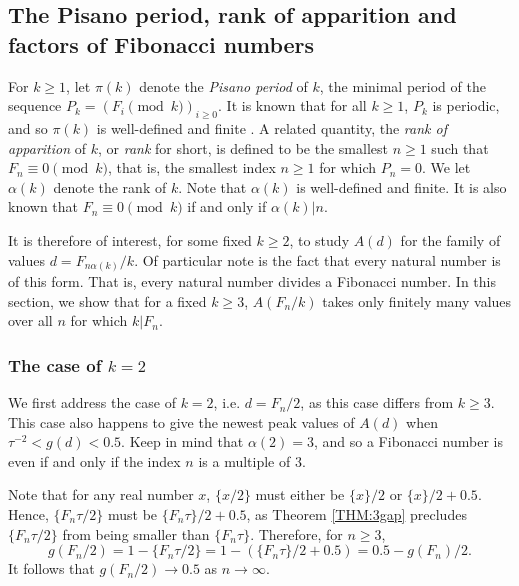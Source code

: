 \documentclass[10pt,a4paper,reqno]{amsart}
\begin{document}
\subsection{The {P}isano period, rank of apparition and factors of {F}ibonacci numbers}
For $k\geq 1$, let $\pi(k)$ denote the \emph{Pisano period} of $k$, the minimal period of the sequence $P_k = (F_i \pmod k)_{i \geq 0}$. It is known that for all $k \geq 1$, $P_k$ is periodic, and so $\pi(k)$ is well-defined and finite \cite{vajda1989}. A related quantity, the \emph{rank of apparition} of $k$, or \emph{rank} for short, is defined to be the smallest $n \geq 1$ such that $F_n\equiv 0 \pmod{k}$, that is, the smallest index $n\geq 1$ for which $P_n=0$. We let $\alpha(k)$ denote the rank of $k$. Note that $\alpha(k)$ is well-defined and finite. It is also known that $F_n \equiv 0 \pmod{k}$ if and only if $\alpha(k)|n$.

It is therefore of interest, for some fixed $k\geq 2$, to study $A(d)$ for the family of values $d=F_{n\alpha(k)}/k$. Of particular note is the fact that every natural number is of this form. That is, every natural number divides a Fibonacci number. In this section, we show that for a fixed $k\geq 3$, $A(F_n/k)$ takes only finitely many values over all $n$ for which $k|F_n$.

\subsubsection{The case of $k = 2$}
We first address the case of $k=2$, i.e. $d=F_n/2$, as this case differs from $k \geq 3$. This case also happens to give the newest peak values of $A(d)$ when $\tau^{-2}<g(d)<0.5$. Keep in mind that $\alpha(2)=3$, and so a Fibonacci number is even if and only if the index $n$ is a multiple of $3$.

Note that for any real number $x$, $\{x/2\}$ must either be $\{x\}/2$ or $\{x\}/2+0.5$. Hence, $\{F_n\tau/2\}$ must be $\{F_n \tau\}/2+0.5$, as Theorem \ref{THM:3gap} precludes $\{F_n\tau/2\}$ from being smaller than $\{F_n\tau\}$. Therefore, for $n \geq 3$,
\[
g(F_n/2) = 1-\{F_n\tau/2\} = 1-(\{F_n\tau\}/2+0.5)=0.5-g(F_n)/2.
\]
It follows that $g(F_n/2) \to 0.5$ as $n \to \infty$.
\end{document}
